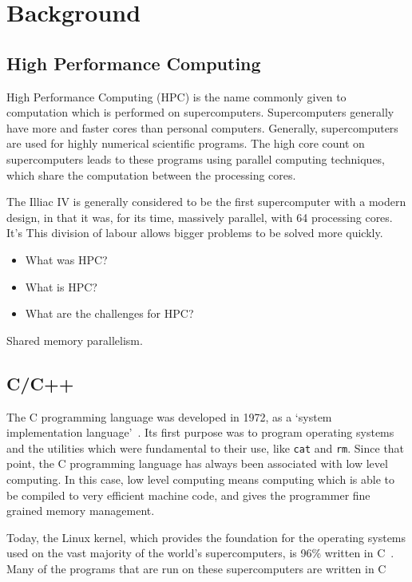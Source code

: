 \chapter{Background}
\section{High Performance Computing}
High Performance Computing (HPC) is the name commonly given to computation which is performed on supercomputers. 
Supercomputers generally have more and faster cores than personal computers. Generally, supercomputers are used for highly numerical scientific programs. The high core count on supercomputers leads to these programs using parallel computing techniques, which share the computation between the processing cores.

The Illiac IV is generally considered to be the first supercomputer with a modern design, in that it was, for its time, massively parallel, with 64 processing cores. It's 
This division of labour allows bigger problems to be solved more quickly.

\begin{itemize}
    \item What was HPC?
    \item What is HPC?
    \item What are the challenges for HPC?
\end{itemize}

Shared memory parallelism.

\section{C/C++}
The C programming language was developed in 1972, as a `system implementation language'~\cite{Ritchie:1993}. Its first purpose was to program operating systems and the utilities which were fundamental to their use, like \texttt{cat} and \texttt{rm}. Since that point, the C programming language has always been associated with low level computing. In this case, low level computing means computing which is able to be compiled to very efficient machine code, and gives the programmer fine grained memory management.

Today, the Linux kernel, which provides the foundation for the operating systems used on the vast majority of the world's supercomputers, is 96\% written in C~\cite{LinuxKernel}. Many of the programs that are run on these supercomputers are written in C~\cite{fftw, ffs, foam}

